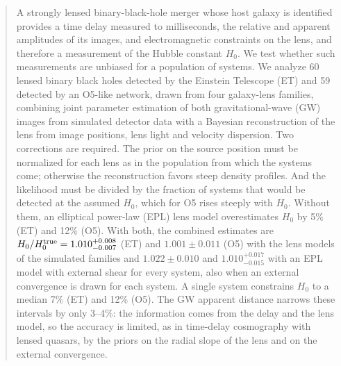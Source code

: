 \begin{abstract}
A strongly lensed binary-black-hole merger whose host galaxy is identified provides a time delay measured to milliseconds, the relative and apparent amplitudes of its images, and electromagnetic constraints on the lens, and therefore a measurement of the Hubble constant $H_0$. We test whether such measurements are unbiased for a population of systems. We analyze 60 lensed binary black holes detected by the Einstein Telescope (ET) and 59 detected by an O5-like network, drawn from four galaxy-lens families, combining joint parameter estimation of both gravitational-wave (GW) images from simulated detector data with a Bayesian reconstruction of the lens from image positions, lens light and velocity dispersion. Two corrections are required. The prior on the source position must be normalized for each lens as in the population from which the systems come; otherwise the reconstruction favors steep density profiles. And the likelihood must be divided by the fraction of systems that would be detected at the assumed $H_0$, which for O5 rises steeply with $H_0$. Without them, an elliptical power-law (EPL) lens model overestimates $H_0$ by 5\% (ET) and 12\% (O5). With both, the combined estimates are $H_0/H_0^{\rm true}=1.010^{+0.008}_{-0.007}$ (ET) and $1.001\pm0.011$ (O5) with the lens models of the simulated families and $1.022\pm0.010$ and $1.010^{+0.017}_{-0.015}$ with an EPL model with external shear for every system, also when an external convergence is drawn for each system. A single system constrains $H_0$ to a median 7\% (ET) and 12\% (O5). The GW apparent distance narrows these intervals by only 3--4\%: the information comes from the delay and the lens model, so the accuracy is limited, as in time-delay cosmography with lensed quasars, by the priors on the radial slope of the lens and on the external convergence.
\end{abstract}
